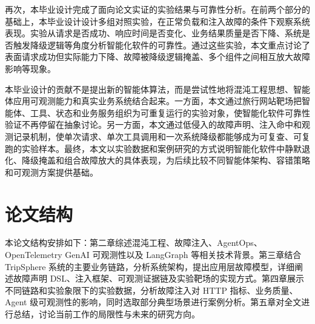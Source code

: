 再次，本毕业设计完成了面向论文实证的实验结果与可靠性分析。在前两个部分的基础上，本毕业设计设计多组对照实验，在正常负载和注入故障的条件下观察系统表现。实验从请求是否成功、响应时间是否变化、业务结果质量是否下降、系统是否触发降级逻辑等角度分析智能化软件的可靠性。通过这些实验，本文重点讨论了表面请求成功但实际能力下降、故障被降级逻辑掩盖、多个组件之间相互放大故障影响等现象。

本毕业设计的贡献不是提出新的智能体算法，而是尝试性地将混沌工程思想、智能体应用可观测能力和真实业务系统结合起来。一方面，本文通过旅行网站靶场把智能体、工具、状态和业务服务组织为可重复运行的实验对象，使智能化软件可靠性验证不再停留在抽象讨论。另一方面，本文通过低侵入的故障声明、注入命中和观测记录机制，使单次请求、单次工具调用和一次系统降级都能够成为可复查、可复跑的实验样本。最终，本文以实验数据和案例研究的方式说明智能化软件中静默退化、降级掩盖和组合故障放大的具体表现，为后续比较不同智能体架构、容错策略和可观测方案提供基础。

\section{论文结构}

本论文结构安排如下：第二章综述混沌工程、故障注入、AgentOps、OpenTelemetry GenAI 可观测性以及 LangGraph 等相关技术背景。第三章结合 TripSphere 系统的主要业务链路，分析系统架构，提出应用层故障模型，详细阐述故障声明 DSL、注入框架、可观测证据链及实验靶场的实现方式。第四章展示不同链路和实验象限下的实验数据，分析故障注入对 HTTP 指标、业务质量、Agent 级可观测性的影响，同时选取部分典型场景进行案例分析。第五章对全文进行总结，讨论当前工作的局限性与未来的研究方向。

